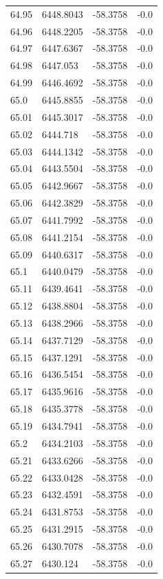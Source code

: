 \begin{table}[H]
\begin{tabular}{llll}
64.95 & 6448.8043 & -58.3758 & -0.0 \\
64.96 & 6448.2205 & -58.3758 & -0.0 \\
64.97 & 6447.6367 & -58.3758 & -0.0 \\
64.98 & 6447.053 & -58.3758 & -0.0 \\
64.99 & 6446.4692 & -58.3758 & -0.0 \\
65.0 & 6445.8855 & -58.3758 & -0.0 \\
65.01 & 6445.3017 & -58.3758 & -0.0 \\
65.02 & 6444.718 & -58.3758 & -0.0 \\
65.03 & 6444.1342 & -58.3758 & -0.0 \\
65.04 & 6443.5504 & -58.3758 & -0.0 \\
65.05 & 6442.9667 & -58.3758 & -0.0 \\
65.06 & 6442.3829 & -58.3758 & -0.0 \\
65.07 & 6441.7992 & -58.3758 & -0.0 \\
65.08 & 6441.2154 & -58.3758 & -0.0 \\
65.09 & 6440.6317 & -58.3758 & -0.0 \\
65.1 & 6440.0479 & -58.3758 & -0.0 \\
65.11 & 6439.4641 & -58.3758 & -0.0 \\
65.12 & 6438.8804 & -58.3758 & -0.0 \\
65.13 & 6438.2966 & -58.3758 & -0.0 \\
65.14 & 6437.7129 & -58.3758 & -0.0 \\
65.15 & 6437.1291 & -58.3758 & -0.0 \\
65.16 & 6436.5454 & -58.3758 & -0.0 \\
65.17 & 6435.9616 & -58.3758 & -0.0 \\
65.18 & 6435.3778 & -58.3758 & -0.0 \\
65.19 & 6434.7941 & -58.3758 & -0.0 \\
65.2 & 6434.2103 & -58.3758 & -0.0 \\
65.21 & 6433.6266 & -58.3758 & -0.0 \\
65.22 & 6433.0428 & -58.3758 & -0.0 \\
65.23 & 6432.4591 & -58.3758 & -0.0 \\
65.24 & 6431.8753 & -58.3758 & -0.0 \\
65.25 & 6431.2915 & -58.3758 & -0.0 \\
65.26 & 6430.7078 & -58.3758 & -0.0 \\
65.27 & 6430.124 & -58.3758 & -0.0 \\

\end{tabular}
\end{table}
